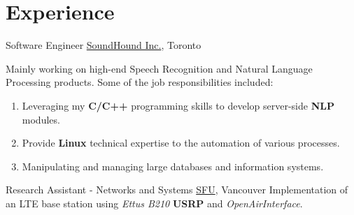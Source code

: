 \documentclass[letterpaper]{twentysecondcv} %
\begin{document}

\section{Experience}

\begin{twenty}

             {Software Engineer}
             {\href{https://soundhound.com/}{SoundHound Inc.}, Toronto}
             {Mainly working on high-end Speech Recognition and Natural Language Processing products. Some of the job responsibilities included:
             \begin{enumerate}
                 \item{Leveraging my \textbf{C/C++} programming skills to develop server-side \textbf{NLP} modules.}
                 \item{Provide \textbf{Linux} technical expertise to the automation of various processes.}
                 \item{Manipulating and managing large databases and information systems.}
             \end{enumerate}
             }

               {Research Assistant - Networks and Systems}
               {\href{https://www.sfu.ca/computing/research/labs/nsl.html}{SFU}, Vancouver}
               {Implementation of an LTE base station using \textit{Ettus B210} \textbf{USRP} and \textit{OpenAirInterface}.
               }


\end{twenty}
\end{document}
